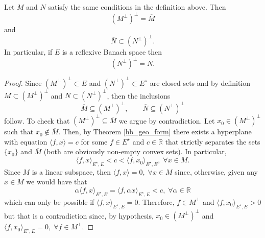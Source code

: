\begin{lemma}\label{banach_ortho_lemma}
    Let \(M\) and \(N\) satisfy the same conditions in the definition above. Then
    \[
        (M^\perp)^\perp = \overline{M}
    \]
    and
    \[
        \overline{N} \subset (N^\perp)^\perp.
    \]
    In particular, if \(E\) is a reflexive Banach space then
    \[
        (N^\perp)^\perp = \overline{N}.
    \]
\end{lemma}
\begin{proof}
    Since \((M^\perp)^\perp \subset E\) and \((N^\perp)^\perp \subset E^\star\) are closed sets and by definition \(M \subset (M^\perp)^\perp\) and \(N \subset (N^\perp)^\perp\), then the inclusions
    \[
        \overline{M} \subseteq (M^\perp)^\perp, \qquad \overline{N} \subseteq (N^\perp)^\perp
    \]
    follow. To check that \((M^\perp)^\perp \subseteq \overline{M}\) we argue by contradiction. Let \(x_0 \in (M^\perp)^\perp\) such that \(x_0 \not \in \overline{M}\). Then, by Theorem \ref{hb_geo_form} there exists a hyperplane with equation \(\langle f, x \rangle = c\) for some \(f \in E^\star\) and \(c \in \mathbb{R}\) that strictly separates the sets \(\{x_0\}\) and \(\overline{M}\) (both are obviously non-empty convex sets). In particular,
    \[
        \langle f, x \rangle_{E^\star, E} < c < \langle f, x_0 \rangle_{E^\star, E}, \; \forall x \in M.
    \]
    Since \(M\) is a linear subspace, then \(\langle f, x \rangle = 0, \; \forall x \in M\) since, otherwise, given any \(x \in M\) we would have that
    \[
        \alpha \langle f, x \rangle_{E^\star, E} = \langle f, \alpha x \rangle_{E^\star, E} < c, \; \forall \alpha \in \mathbb{R}
    \]
    which can only be possible if \(\langle f, x \rangle_{E^\star, E} = 0\). Therefore, \(f \in M^\perp\) and \(\langle f, x_0 \rangle_{E^\star, E} > 0\) but that is a contradiction since, by hypothesis, \(x_0 \in (M^\perp)^\perp\) and \(\langle f, x_0 \rangle_{E^\star, E} = 0, \; \forall f \in M^\perp\).


\end{proof}
